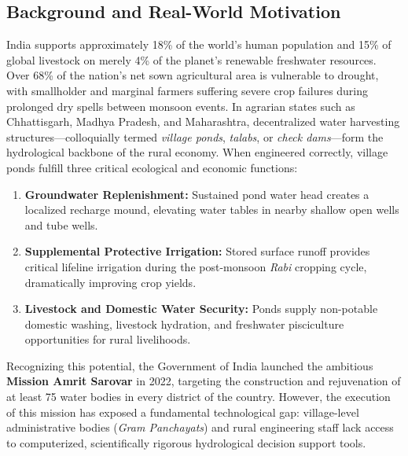 \documentclass[11pt,a4paper]{article}
\begin{document}
\subsection{Background and Real-World Motivation}
India supports approximately 18\% of the world's human population and 15\% of global livestock on merely 4\% of the planet's renewable freshwater resources. Over 68\% of the nation's net sown agricultural area is vulnerable to drought, with smallholder and marginal farmers suffering severe crop failures during prolonged dry spells between monsoon events. In agrarian states such as Chhattisgarh, Madhya Pradesh, and Maharashtra, decentralized water harvesting structures---colloquially termed \textit{village ponds}, \textit{talabs}, or \textit{check dams}---form the hydrological backbone of the rural economy. When engineered correctly, village ponds fulfill three critical ecological and economic functions:
\begin{enumerate}[noitemsep,topsep=2pt]
    \item \textbf{Groundwater Replenishment:} Sustained pond water head creates a localized recharge mound, elevating water tables in nearby shallow open wells and tube wells.
    \item \textbf{Supplemental Protective Irrigation:} Stored surface runoff provides critical lifeline irrigation during the post-monsoon \textit{Rabi} cropping cycle, dramatically improving crop yields.
    \item \textbf{Livestock and Domestic Water Security:} Ponds supply non-potable domestic washing, livestock hydration, and freshwater pisciculture opportunities for rural livelihoods.
\end{enumerate}

Recognizing this potential, the Government of India launched the ambitious \textbf{Mission Amrit Sarovar} in 2022, targeting the construction and rejuvenation of at least 75 water bodies in every district of the country. However, the execution of this mission has exposed a fundamental technological gap: village-level administrative bodies (\textit{Gram Panchayats}) and rural engineering staff lack access to computerized, scientifically rigorous hydrological decision support tools.
\end{document}
